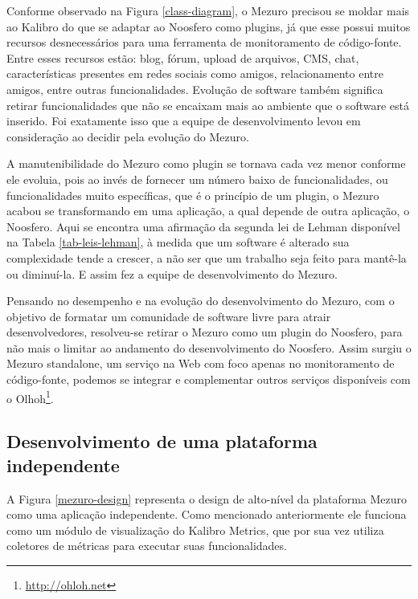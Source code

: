 Conforme observado na Figura \ref{class-diagram}, o Mezuro precisou se moldar mais ao Kalibro do que se adaptar ao Noosfero como plugins, já que esse possui muitos recursos desnecessários para uma ferramenta de monitoramento de código-fonte. Entre esses recursos estão: blog, fórum, upload de arquivos, CMS, chat, características presentes em redes sociais como amigos, relacionamento entre amigos, entre outras funcionalidades. Evolução de software também significa retirar funcionalidades que não se encaixam mais ao ambiente que o software está inserido. Foi exatamente isso que a equipe de desenvolvimento levou em consideração ao decidir pela evolução do Mezuro.

A manutenibilidade do Mezuro como plugin se tornava cada vez menor conforme ele evoluia, pois ao invés de fornecer um número baixo de funcionalidades, ou funcionalidades muito específicas, que é o princípio de um plugin, o Mezuro acabou se transformando em uma aplicação, a qual depende de outra aplicação, o Noosfero. Aqui se encontra uma afirmação da segunda lei de Lehman disponível na Tabela \ref{tab-leis-lehman}, à medida que um software é alterado sua complexidade tende a crescer, a não ser que um trabalho seja feito para mantê-la ou diminuí-la. E assim fez a equipe de desenvolvimento do Mezuro.

Pensando no desempenho e na evolução do desenvolvimento do Mezuro, com o objetivo de formatar um comunidade de software livre para atrair desenvolvedores, resolveu-se retirar o Mezuro como um plugin do Noosfero, para não mais o limitar ao andamento do desenvolvimento do Noosfero. Assim surgiu o Mezuro standalone, um serviço na Web com foco apenas no monitoramento de código-fonte, podemos se integrar e complementar outros serviços disponíveis com o Olhoh\footnote{\url{http://ohloh.net}}.

\subsection{Desenvolvimento de uma plataforma independente}

A Figura \ref{mezuro-design} representa o design de alto-nível da plataforma Mezuro como uma aplicação independente. Como mencionado anteriormente ele funciona como um módulo de visualização do Kalibro Metrics, que por sua vez utiliza coletores de métricas para executar suas funcionalidades.

